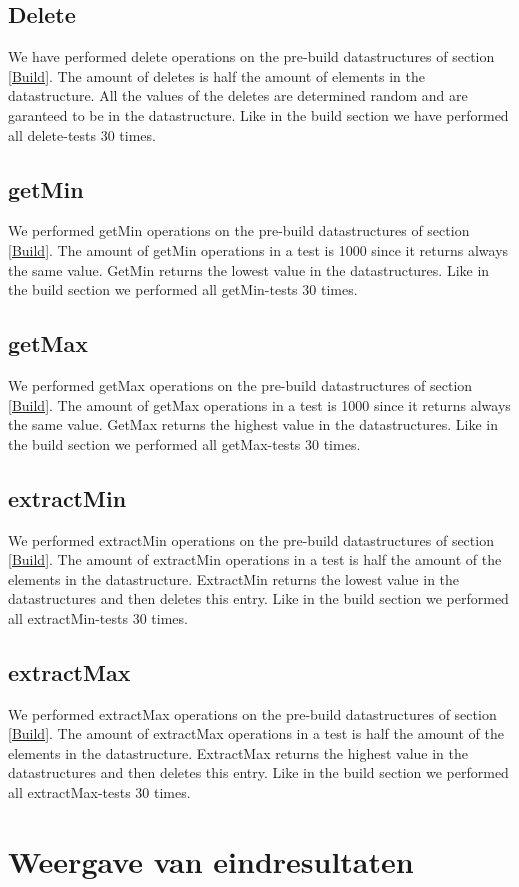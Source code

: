 \documentclass{article}
\begin{document}
\subsection{Delete}
We have performed delete operations on the pre-build datastructures of section \ref{Build}. The amount of deletes is half the amount of elements in the datastructure. All the values of the deletes are determined random and are garanteed to be in the datastructure. Like in the build section we have performed all delete-tests 30 times.
\subsection{getMin}
We performed getMin operations on the pre-build datastructures of section \ref{Build}. The amount of getMin operations in a test is 1000 since it returns always the same value. GetMin returns the lowest value in the datastructures. Like in the build section we performed all getMin-tests 30 times.
\label{getMin}
\subsection{getMax}
We performed getMax operations on the pre-build datastructures of section \ref{Build}. The amount of getMax operations in a test is 1000 since it returns always the same value. GetMax returns the highest value in the datastructures. Like in the build section we performed all getMax-tests 30 times.
\label{getMax}
\subsection{extractMin}
We performed extractMin operations on the pre-build datastructures of section \ref{Build}. The amount of extractMin operations in a test is half the amount of the elements in the datastructure. ExtractMin returns the lowest value in the datastructures and then deletes this entry. Like in the build section we performed all extractMin-tests 30 times.
\subsection{extractMax}
We performed extractMax operations on the pre-build datastructures of section \ref{Build}. The amount of extractMax operations in a test is half the amount of the elements in the datastructure. ExtractMax returns the highest value in the datastructures and then deletes this entry. Like in the build section we performed all extractMax-tests 30 times.
\section{Weergave van eindresultaten}
\end{document}
